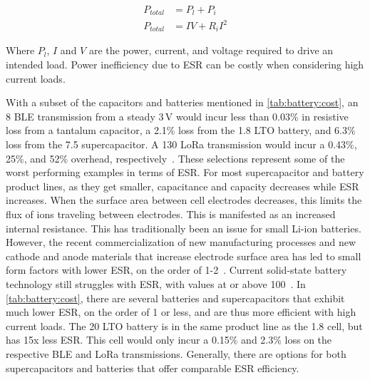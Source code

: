 \begin{equation}\label{eqn:battery:p_total}
\begin{split}
P_{total} &= P_{l} + P_{i} \\
P_{total} &=  I V + R_{i} I^2
\end{split}
\end{equation}

\noindent Where $P_l$, $I$ and $V$ are the power, current, and voltage required to drive an intended load. Power inefficiency due to ESR can be costly when considering high current loads.

With a subset of the capacitors and batteries mentioned in \cref{tab:battery:cost}, an 8\ssi{\milli\ampere} BLE
transmission from a steady 3\,V would incur less
than 0.03\% in resistive loss from a tantalum capacitor, a 2.1\% loss from the 1.8\ssi{\milli\Ah} LTO battery, and 6.3\% loss from the 7.5\ssi{\milli\farad} supercapacitor. A 130\ssi{\milli\ampere} LoRa transmission would incur a 0.43\%, 25\%, and 52\% overhead, respectively~\cite{ghena2019challenge}. These selections represent some of the worst performing examples in terms of ESR. 
For most supercapacitor and battery product lines, as they get smaller, capacitance and capacity decreases while ESR increases. When the surface area between cell electrodes decreases, this limits the flux of ions traveling between electrodes. This is manifested as an increased internal resistance.
This has traditionally been an issue for small Li-ion batteries. However, the recent commercialization of new manufacturing processes and new cathode and anode materials that increase electrode surface area has led to small form factors with lower ESR, on the order of 1-2\ssi{\ohm}~\cite{millibatNimbus}. Current solid-state battery technology still struggles with ESR, with values at or above 100\ssi{\ohm}~\cite{stEnfilm,tdkCeraCharge}.
In \cref{tab:battery:cost}, there are several batteries and supercapacitors that exhibit much lower ESR, on the order of 1\ssi{\ohm} or less, and are thus more efficient with high current loads. 
The 20\ssi{\milli\Ah} LTO battery is in the same product line as the 1.8\ssi{\milli\Ah} cell, but has 15x less ESR. This cell would only incur a 0.15\% and 2.3\% loss on the respective BLE and LoRa transmissions.
Generally, there are options for both supercapacitors and batteries that offer comparable ESR efficiency. %


